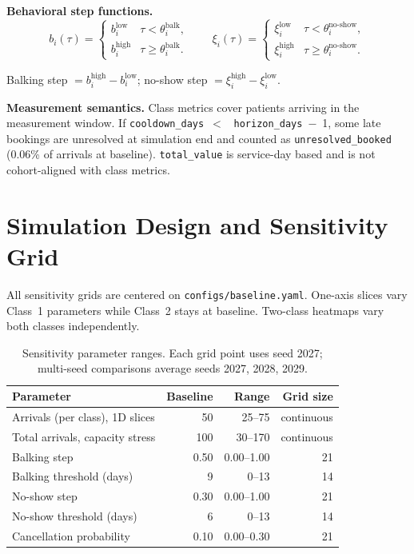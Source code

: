 \documentclass[11pt]{article}
\begin{document}
\medskip
\noindent\textbf{Behavioral step functions.}
\[
  b_i(\tau) = \begin{cases}
    b_i^{\text{low}} & \tau < \theta_i^{\text{balk}}, \\
    b_i^{\text{high}} & \tau \geq \theta_i^{\text{balk}}.
  \end{cases}
  \qquad
  \xi_i(\tau) = \begin{cases}
    \xi_i^{\text{low}} & \tau < \theta_i^{\text{no-show}}, \\
    \xi_i^{\text{high}} & \tau \geq \theta_i^{\text{no-show}}.
  \end{cases}
\]

Balking step $= b_i^{\text{high}} - b_i^{\text{low}}$; no-show step
$= \xi_i^{\text{high}} - \xi_i^{\text{low}}$.

\medskip
\noindent\textbf{Measurement semantics.} Class metrics cover patients
arriving in the measurement window. If \texttt{cooldown\_days}~$<$~%
\texttt{horizon\_days}~$-$~1, some late bookings are unresolved at
simulation end and counted as \texttt{unresolved\_booked} (0.06\% of
arrivals at baseline). \texttt{total\_value} is service-day based and
is not cohort-aligned with class metrics.

\section{Simulation Design and Sensitivity Grid}
\label{app:sens-design}

All sensitivity grids are centered on \texttt{configs/baseline.yaml}.
One-axis slices vary Class~1 parameters while Class~2 stays at baseline.
Two-class heatmaps vary both classes independently.

\begin{table}[H]
\centering
\renewcommand{\arraystretch}{1.15}
\begin{tabular}{p{}rrr}
\toprule
Parameter & Baseline & Range & Grid size \\
\midrule
Arrivals (per class), 1D slices & 50 & 25--75 & continuous \\
Total arrivals, capacity stress & 100 & 30--170 & continuous \\
Balking step & 0.50 & 0.00--1.00 & 21 \\
Balking threshold (days) & 9 & 0--13 & 14 \\
No-show step & 0.30 & 0.00--1.00 & 21 \\
No-show threshold (days) & 6 & 0--13 & 14 \\
Cancellation probability & 0.10 & 0.00--0.30 & 21 \\
\bottomrule
\end{tabular}
\caption{Sensitivity parameter ranges. Each grid point uses seed 2027;
multi-seed comparisons average seeds 2027, 2028, 2029.}
\label{tab:sens-grid}
\end{table}
\end{document}
